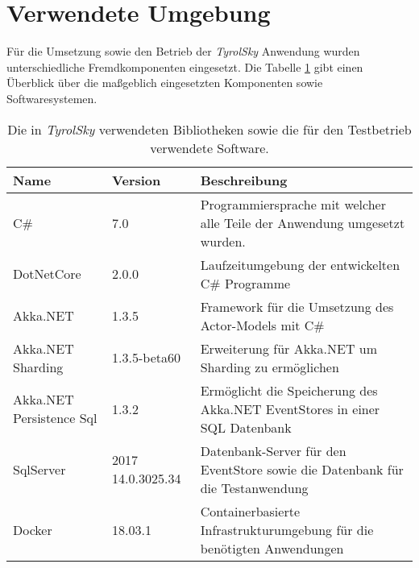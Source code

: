 \section{Verwendete Umgebung}
Für die Umsetzung sowie den Betrieb der \textit{TyrolSky} Anwendung wurden unterschiedliche Fremdkomponenten eingesetzt. Die Tabelle \ref{tab:implementation:EnvironmentVersions} gibt einen Überblick über die maßgeblich eingesetzten Komponenten sowie Softwaresystemen. 

\begin{table}[h]
  \centering
  \begin{tabular}{llp{6.5cm}}
  Name      & Version    & Beschreibung \\ \hline
  C\#     & 7.0        & Programmiersprache mit welcher alle Teile der Anwendung umgesetzt wurden. \\
  DotNetCore   & 2.0.0       & Laufzeitumgebung der entwickelten C\# Programme \\
  Akka.NET    & 1.3.5       & Framework für die Umsetzung des  Actor-Models mit C\# \\
  Akka.NET Sharding & 1.3.5-beta60  & Erweiterung für Akka.NET um Sharding zu ermöglichen \\
  Akka.NET Persistence Sql & 1.3.2  & Ermöglicht die Speicherung des Akka.NET EventStores in einer SQL Datenbank\\
  SqlServer    & 2017 14.0.3025.34 & Datenbank-Server für den EventStore sowie die Datenbank für die Testanwendung\\
  Docker     & 18.03.1      & Containerbasierte Infrastrukturumgebung für die benötigten Anwendungen\\
    \end{tabular}
    \caption{Die in \textit{TyrolSky} verwendeten Bibliotheken sowie die für den Testbetrieb verwendete Software.}
    \label{tab:implementation:EnvironmentVersions}
    \end{table}